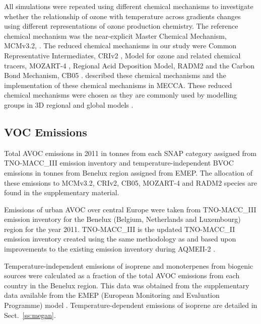All simulations were repeated using different chemical mechanisms to investigate whether the relationship of ozone with temperature across  gradients changes using different representations of ozone production chemistry.
The reference chemical mechanism was the near-explicit Master Chemical Mechanism, MCMv3.2, \citep{Jenkin:1997, Jenkin:2003, Saunders:2003, MCM_Site}.
The reduced chemical mechanisms in our study were Common Representative Intermediates, CRIv2 \citep{Jenkin:2008}, Model for ozone and related chemical tracers, MOZART-4 \citep{Emmons:2010}, Regional Acid Deposition Model, RADM2 \citep{Stockwell:1990} and the Carbon Bond Mechanism, CB05 \citep{Yarwood:2005}. 
\citet{Coates:2015} described these chemical mechanisms and the implementation of these chemical mechanisms in MECCA.
These reduced chemical mechanisms were chosen as they are commonly used by modelling groups in 3D regional and global models \citep{Baklanov:2014}.

\subsection{VOC Emissions} \label{ss:VOC_emissions}
{%
    \renewcommand{\arraystretch}{1.1}%
    \begin{table}%
        \centering%
        \caption{Total AVOC emissions in 2011 in tonnes from each SNAP category assigned from TNO-MACC\_III emission inventory and temperature-independent BVOC emissions in tonnes from Benelux region assigned from EMEP. The allocation of these emissions to MCMv3.2, CRIv2, CB05, MOZART-4 and RADM2 species are found in the supplementary material.}%
        \label{t:emissions}%
    \end{table}%
}
Emissions of urban AVOC over central Europe were taken from TNO-MACC\_III emission inventory for the Benelux (Belgium, Netherlands and Luxembourg) region for the year 2011.
TNO-MACC\_III is the updated TNO-MACC\_II emission inventory created using the same methodology as \citet{Kuenen:2014} and based upon improvements to the existing emission inventory during AQMEII-2 \citep{Pouliot:2015}. 

Temperature-independent emissions of isoprene and monoterpenes from biogenic sources were calculated as a fraction of the total AVOC emissions from each country in the Benelux region.
This data was obtained from the supplementary data available from the EMEP (European Monitoring and Evaluation Programme) model \citep{Simpson:2012}.
Temperature-dependent emissions of isoprene are detailed in Sect.~\ref{ss:megan}.

